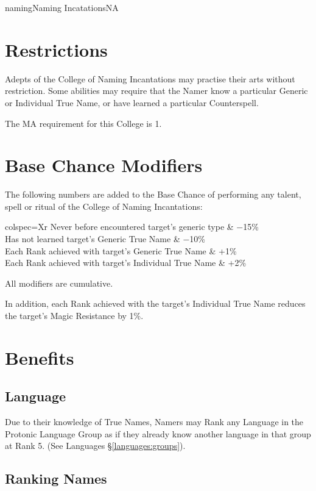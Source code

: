 \begin{College}[2.0]{naming}{Naming Incatations}{NA}
\section{Restrictions}

Adepts of the College of Naming Incantations may practise their arts
without restriction.  Some abilities may require that the Namer know a
particular Generic or Individual True Name, or have learned a
particular Counterspell.

The MA requirement for this College is 1. 


\section{Base Chance Modifiers}

The following numbers are added to the Base Chance of performing any
talent, spell or ritual of the College of Naming Incantations:

\begin{dqtblr}{colspec={Xr}}
Never before encountered target’s generic type		& −15\% \\
Has not learned target’s Generic True Name		& −10\% \\
Each Rank achieved with target’s Generic True Name	& +1\% \\
Each Rank achieved with target’s Individual True Name 	& +2\% \\
\end{dqtblr}

All modifiers are cumulative. 

In addition, each Rank achieved with the target’s Individual True Name
reduces the target’s Magic Resistance by 1\%.

\section{Benefits}

\subsection{Language}

Due to their knowledge of True Names, Namers may Rank any Language in
the Protonic Language Group as if they already know another language
in that group at Rank 5. (See Languages \S\ref{languages:groups}).

\subsection{Ranking Names}
\label{namer:ranking}


\end{College}
